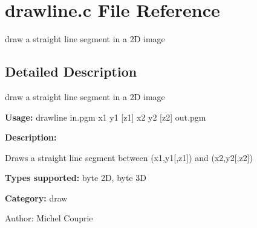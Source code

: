 \section{drawline.c File Reference}
\label{drawline_8c}
draw a straight line segment in a 2D image 



\subsection{Detailed Description}
draw a straight line segment in a 2D image 

{\bf Usage:} drawline in.pgm x1 y1 [z1] x2 y2 [z2] out.pgm

{\bf Description:}

Draws a straight line segment between (x1,y1[,z1]) and (x2,y2[,z2])

{\bf Types supported:} byte 2D, byte 3D

{\bf Category:} draw

\begin{Desc}
\item[Author:]Michel Couprie \end{Desc}
